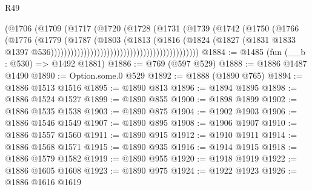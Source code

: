 \begin{lexlean}{R49}
\begin{coremodule}
                                                        (@1706
                                                          (@1709
                                                            (@1717
                                                              (@1720
                                                                (@1728
                                                                  (@1731
                                                                    (@1739
                                                                      (@1742
                                                                        (@1750
                                                                          (@1766
                                                                            (@1776
                                                                              (@1779
                                                                                (@1787
                                                                                  (@1803
                                                                                    (@1813
                                                                                      (@1816
                                                                                        (@1824
                                                                                          (@1827
                                                                                            (@1831
                                                                                              @1833
                                                                                              @1397
                                                                                              @536)))))))))))))))))))))))))))))))))))))))))))))
@1884 := @1485 (fun (__b : @530) => @1492 @1881)
@1886 := @769 (@597 @529)
@1888 := @1886 @1487 @1490
@1890 := Option.some.{0} @529
@1892 := @1888 (@1890 @765)
@1894 := @1886 @1513 @1516
@1895 := @1890 @813
@1896 := @1894 @1895
@1898 := @1886 @1524 @1527
@1899 := @1890 @855
@1900 := @1898 @1899
@1902 := @1886 @1535 @1538
@1903 := @1890 @875
@1904 := @1902 @1903
@1906 := @1886 @1546 @1549
@1907 := @1890 @895
@1908 := @1906 @1907
@1910 := @1886 @1557 @1560
@1911 := @1890 @915
@1912 := @1910 @1911
@1914 := @1886 @1568 @1571
@1915 := @1890 @935
@1916 := @1914 @1915
@1918 := @1886 @1579 @1582
@1919 := @1890 @955
@1920 := @1918 @1919
@1922 := @1886 @1605 @1608
@1923 := @1890 @975
@1924 := @1922 @1923
@1926 := @1886 @1616 @1619

\end{coremodule}
\end{lexlean}
